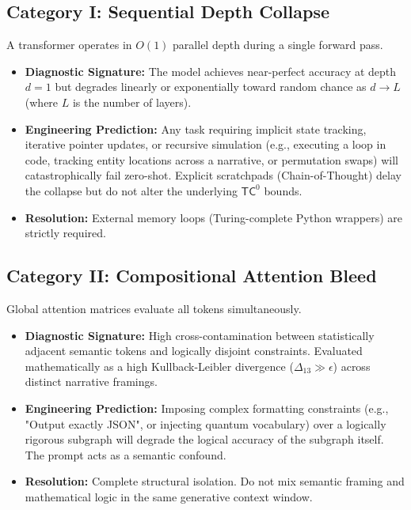 \documentclass[12pt,a4paper]{article}
\begin{document}
\subsection{Category I: Sequential Depth Collapse}
A transformer operates in $O(1)$ parallel depth during a single forward pass.
\begin{itemize}
    \item \textbf{Diagnostic Signature:} The model achieves near-perfect accuracy at depth $d=1$ but degrades linearly or exponentially toward random chance as $d \to L$ (where $L$ is the number of layers).
    \item \textbf{Engineering Prediction:} Any task requiring implicit state tracking, iterative pointer updates, or recursive simulation (e.g., executing a loop in code, tracking entity locations across a narrative, or permutation swaps) will catastrophically fail zero-shot. Explicit scratchpads (Chain-of-Thought) delay the collapse but do not alter the underlying $\mathsf{TC}^0$ bounds.
    \item \textbf{Resolution:} External memory loops (Turing-complete Python wrappers) are strictly required.
\end{itemize}

\subsection{Category II: Compositional Attention Bleed}
Global attention matrices evaluate all tokens simultaneously.
\begin{itemize}
    \item \textbf{Diagnostic Signature:} High cross-contamination between statistically adjacent semantic tokens and logically disjoint constraints. Evaluated mathematically as a high Kullback-Leibler divergence ($\Delta_{13} \gg \epsilon$) across distinct narrative framings.
    \item \textbf{Engineering Prediction:} Imposing complex formatting constraints (e.g., "Output exactly JSON", or injecting quantum vocabulary) over a logically rigorous subgraph will degrade the logical accuracy of the subgraph itself. The prompt acts as a semantic confound.
    \item \textbf{Resolution:} Complete structural isolation. Do not mix semantic framing and mathematical logic in the same generative context window.
\end{itemize}
\end{document}
